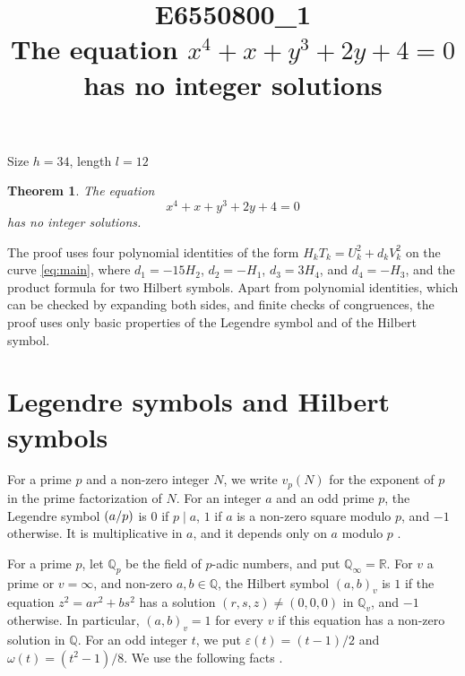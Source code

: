 \documentclass[11pt]{article}
\title{\textbf{E6550800\_1}\\[4pt] {\Large The equation $x^{4}+x+y^{3}+2y+4=0$ has no integer solutions}}
\author{}
\date{}
\newtheorem{theorem}{Theorem}
\newcommand{\Q}{\mathbb{Q}}
\newcommand{\leg}[2]{\mathchoice{\biggl(\dfrac{#1}{#2}\biggr)}{(#1/#2)}{(#1/#2)}{(#1/#2)}}
\begin{document}
\maketitle
\vspace{-8ex}
\begin{center}
Size $h=34$, length $l=12$
\end{center}

\begin{theorem}\label{thm:main}
The equation
\begin{equation}\label{eq:main}
x^{4}+x+y^{3}+2y+4=0
\end{equation}
has no integer solutions.
\end{theorem}

The proof uses four polynomial identities of the form $H_kT_k=U_k^2+d_kV_k^2$ on the curve \eqref{eq:main}, where $d_{1}=-15H_{2}$, $d_{2}=-H_{1}$, $d_{3}=3H_{4}$, and $d_{4}=-H_{3}$, and the product formula for two Hilbert symbols. Apart from polynomial identities, which can be checked by expanding both sides, and finite checks of congruences, the proof uses only basic properties of the Legendre symbol and of the Hilbert symbol.

\section{Legendre symbols and Hilbert symbols}

For a prime $p$ and a non-zero integer $N$, we write $v_p(N)$ for the exponent of $p$ in the prime factorization of $N$. For an integer $a$ and an odd prime $p$, the Legendre symbol $\leg{a}{p}$ is $0$ if $p\mid a$, $1$ if $a$ is a non-zero square modulo $p$, and $-1$ otherwise. It is multiplicative in $a$, and it depends only on $a$ modulo $p$ \cite[Chapter~5]{IR}.

For a prime $p$, let $\Q_p$ be the field of $p$-adic numbers, and put $\Q_\infty=\mathbb R$. For $v$ a prime or $v=\infty$, and non-zero $a,b\in\Q$, the Hilbert symbol $(a,b)_v$ is $1$ if the equation $z^2=ar^2+bs^2$ has a solution $(r,s,z)\neq(0,0,0)$ in $\Q_v$, and $-1$ otherwise. In particular, $(a,b)_v=1$ for every $v$ if this equation has a non-zero solution in $\Q$. For an odd integer $t$, we put $\varepsilon(t)=(t-1)/2$ and $\omega(t)=(t^2-1)/8$. We use the following facts \cite[Chapter~III, Proposition~2 and Theorems~1 and~3]{Se}.
\end{document}
